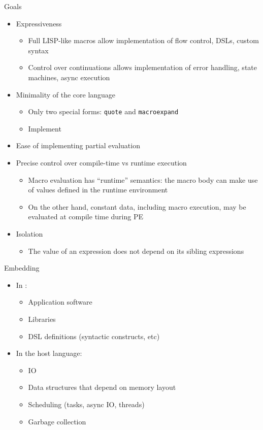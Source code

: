 \begin{frame}[fragile]{Goals}
\begin{itemize}
    \item Expressiveness
        \begin{itemize}
            \item Full LISP-like macros allow implementation of flow control, DSLs, custom syntax
            \item Control over continuations allows implementation of error handling, state machines, async execution
        \end{itemize}
    \item Minimality of the core language
        \begin{itemize}
            \item Only two special forms: \verb|quote| and \verb|macroexpand|
            \item Implement
        \end{itemize}
    \item Ease of implementing partial evaluation
    \item Precise control over compile-time vs runtime execution
        \begin{itemize}
            \item Macro evaluation has ``runtime'' semantics: the macro body can make use of values defined in the runtime environment
            \item On the other hand, constant data, including macro execution, may be evaluated at compile time during PE
        \end{itemize}
    \item Isolation
        \begin{itemize}
            \item The value of an expression does not depend on its sibling expressions
        \end{itemize}
\end{itemize}
\end{frame}

\begin{frame}[fragile]{Embedding}
\begin{itemize}
    \item In \lang:
        \begin{itemize}
            \item Application software
            \item Libraries
            \item DSL definitions (syntactic constructs, etc)
        \end{itemize}
    \item In the host language:
        \begin{itemize}
            \item IO
            \item Data structures that depend on memory layout
            \item Scheduling (tasks, async IO, threads)
            \item Garbage collection
        \end{itemize}
\end{itemize}
\end{frame}

